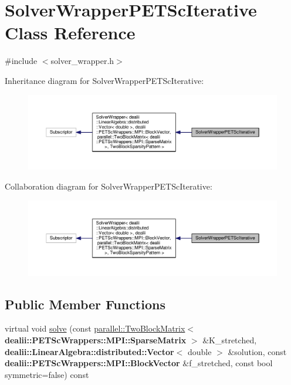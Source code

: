 \hypertarget{class_solver_wrapper_p_e_t_sc_iterative}{}\section{Solver\+Wrapper\+P\+E\+T\+Sc\+Iterative Class Reference}
\label{class_solver_wrapper_p_e_t_sc_iterative}


{\ttfamily \#include $<$solver\+\_\+wrapper.\+h$>$}



Inheritance diagram for Solver\+Wrapper\+P\+E\+T\+Sc\+Iterative\+:\nopagebreak
\begin{figure}[H]
\begin{center}
\leavevmode
\includegraphics[width=350pt]{class_solver_wrapper_p_e_t_sc_iterative__inherit__graph}
\end{center}
\end{figure}


Collaboration diagram for Solver\+Wrapper\+P\+E\+T\+Sc\+Iterative\+:\nopagebreak
\begin{figure}[H]
\begin{center}
\leavevmode
\includegraphics[width=350pt]{class_solver_wrapper_p_e_t_sc_iterative__coll__graph}
\end{center}
\end{figure}
\subsection*{Public Member Functions}
\begin{DoxyCompactItemize}
\item 
virtual void \hyperlink{class_solver_wrapper_p_e_t_sc_iterative_a22441581003123bc0ecefde1cf0f121a}{solve} (const \hyperlink{classparallel_1_1_two_block_matrix}{parallel\+::\+Two\+Block\+Matrix}$<$ {\bf dealii\+::\+P\+E\+T\+Sc\+Wrappers\+::\+M\+P\+I\+::\+Sparse\+Matrix} $>$ \&K\+\_\+stretched, {\bf dealii\+::\+Linear\+Algebra\+::distributed\+::\+Vector}$<$ double $>$ \&solution, const {\bf dealii\+::\+P\+E\+T\+Sc\+Wrappers\+::\+M\+P\+I\+::\+Block\+Vector} \&f\+\_\+stretched, const bool symmetric=false) const 
\end{DoxyCompactItemize}


